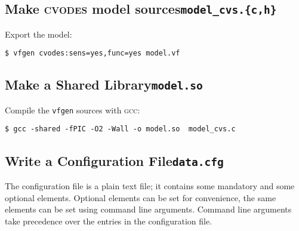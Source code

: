 \documentclass[english,12pt]{scrartcl}
\begin{document}
\subsection[make \textsc{cvodes} model sources]{Make \textsc{cvodes}
  model sources\hfill\texttt{model\_cvs.\{c,h\}}}
\label{sec:c}

Export the model:
\begin{verbatim}
$ vfgen cvodes:sens=yes,func=yes model.vf
\end{verbatim}

\subsection[make a shared library]{Make a Shared Library\hfill\texttt{model.so}}
\label{sec:so}

Compile the \texttt{vfgen} sources with \textsc{gcc}:
\begin{verbatim}
$ gcc -shared -fPIC -O2 -Wall -o model.so  model_cvs.c
\end{verbatim}

\subsection[write a configuration/data file]{Write a Configuration File\hfill\texttt{data.cfg}}
\label{sec:configuration}

The configuration file is a plain text file; it contains some
mandatory and some optional elements. Optional elements can be set for
convenience, the same elements can be set using command line
arguments. Command line arguments take precedence over the entries in
the configuration file.
\end{document}
